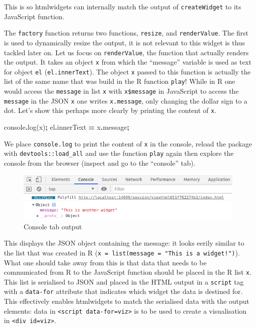 \documentclass[
]{krantz}
\makeatletter
\newenvironment{Shaded}{\begin{snugshade}}{\end{snugshade}}
\newcommand{\AttributeTok}[1]{\textcolor[rgb]{0.61,0.61,0.61}{#1}}
\newcommand{\BuiltInTok}[1]{#1}
\newcommand{\FunctionTok}[1]{\textcolor[rgb]{0,0,0}{#1}}
\newcommand{\NormalTok}[1]{#1}
\newcommand{\OperatorTok}[1]{\textcolor[rgb]{0.43,0.43,0.43}{\textbf{#1}}}
\newenvironment{kframe}{%
\medskip{}
\setlength{\fboxsep}{.8em}
 \def\at@end@of@kframe{}%
 \ifinner\ifhmode%
  \def\at@end@of@kframe{\end{minipage}}%
  \begin{minipage}{\columnwidth}%
 \fi\fi%
 \def\FrameCommand##1{\hskip\@totalleftmargin \hskip-\fboxsep
 \colorbox{shadecolor}{##1}\hskip-\fboxsep
     \hskip-\linewidth \hskip-\@totalleftmargin \hskip\columnwidth}%
 \MakeFramed {\advance\hsize-\width
   \@totalleftmargin\z@ \linewidth\hsize
   \@setminipage}}%
 {\par\unskip\endMakeFramed%
 \at@end@of@kframe}
\renewenvironment{Shaded}{\begin{kframe}}{\end{kframe}}
\makeatother
\begin{document}
This is so htmlwidgets can internally match the output of \texttt{createWidget} to its JavaScript function.

The \texttt{factory} function returns two functions, \texttt{resize}, and \texttt{renderValue}. The first is used to dynamically resize the output, it is not relevant to this widget is thus tackled later on. Let us focus on \texttt{renderValue}, the function that actually renders the output. It takes an object \texttt{x} from which the ``message'' variable is used as text for object \texttt{el} (\texttt{el.innerText}). The object \texttt{x} passed to this function is actually the list of the same name that was build in the R function \texttt{play}! While in R one would access the \texttt{message} in list \texttt{x} with \texttt{x\$message} in JavaScript to access the \texttt{message} in the JSON \texttt{x} one writes \texttt{x.message}, only changing the dollar sign to a dot. Let's show this perhaps more clearly by printing the content of \texttt{x}.

\begin{Shaded}
\begin{Highlighting}[]
\BuiltInTok{console}\OperatorTok{.}\FunctionTok{log}\NormalTok{(x)}\OperatorTok{;}
\NormalTok{el}\OperatorTok{.}\AttributeTok{innerText} \OperatorTok{=}\NormalTok{ x}\OperatorTok{.}\AttributeTok{message}\OperatorTok{;}
\end{Highlighting}
\end{Shaded}

We place \texttt{console.log} to print the content of \texttt{x} in the console, reload the package with \texttt{devtools::load\_all} and use the function \texttt{play} again then explore the console from the browser (inspect and go to the ``console'' tab).

\begin{figure}
\centering
\includegraphics{images/playground-console-x.png}
\caption{Console tab output}
\end{figure}

This displays the JSON object containing the message: it looks eerily similar to the list that was created in R (\texttt{x\ =\ list(message\ =\ "This\ is\ a\ widget!")}). What one should take away from this is that data that needs to be communicated from R to the JavaScript function should be placed in the R list \texttt{x}. This list is serialised to JSON and placed in the HTML output in a \texttt{script} tag with a \texttt{data-for} attribute that indicates which widget the data is destined for. This effectively enables htmlwidgets to match the serialised data with the output elements: data in \texttt{\textless{}script\ data-for=\textquotesingle{}viz\textquotesingle{}\textgreater{}} is to be used to create a visualisation in \texttt{\textless{}div\ id=\textquotesingle{}viz\textquotesingle{}\textgreater{}}.
\end{document}
